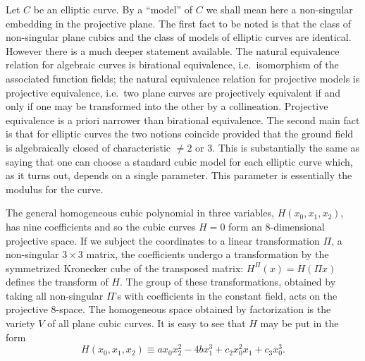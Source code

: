 
Let $C$ be an elliptic curve. By a ``model'' of $C$ we shall mean here a
non-singular embedding in the projective plane. The first fact to be noted
is that the class of non-singular plane cubics and the class of models of
elliptic curves are identical. However there is a much deeper statement
available. The natural equivalence relation for algebraic curves is
birational equivalence, i.e.\ isomorphism of the associated function
fields; the natural equivalence relation for projective models is
projective equivalence, i.e.\ two plane curves are projectively
equivalent if and only if one may be transformed into the other by a
collineation. Projective equivalence is a priori narrower than birational
equivalence. The second main fact is that for elliptic curves the two
notions coincide provided that the ground field is algebraically closed
of characteristic $\neq 2$ or $3$. This is substantially the same as
saying that one can choose a standard cubic model for each elliptic curve
which, as it turns out, depends on a single parameter. This parameter is
essentially the modulus for the curve.

The general homogeneous cubic polynomial in three variables,
$H(x_{0},x_{1},x_{2})$, has nine coefficients and so the cubic curves
$H=0$ form an 8-dimensional projective space. If we subject the
coordinates to a linear transformation $\Pi$, a non-singular $3\times 3$
matrix, the coefficients undergo a transformation by the symmetrized
Kronecker cube of the transposed matrix:
$H^{\Pi}(x)=H(\Pi x)$ defines the transform of $H$. The group of these
transformations, obtained by taking all non-singular $\Pi$'s with
coefficients in the constant field, acts on the projective 8-space. The
homogeneous space obtained by factorization is the variety $V$ of all
plane cubic curves. It is easy to see that $H$ may be put in the form
\[
H(x_{0},x_{1},x_{2})\equiv ax_{0}x_{2}^{2}-4bx_{1}^{3}
+c_{2}x_{0}^{2}x_{1}+c_{3}x_{0}^{3}.
\]


